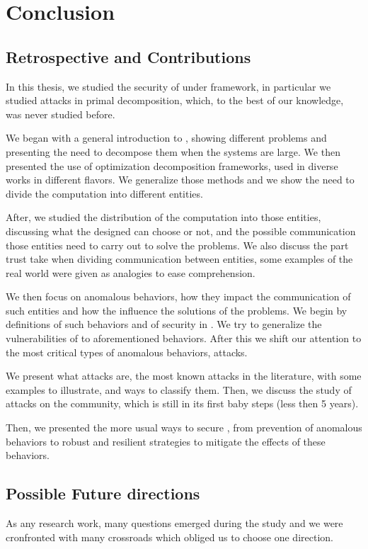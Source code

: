 \documentclass[../main.tex]{subfiles}
\begin{document}
\chapter{Conclusion}\label{sec:conclusion}

\section{Retrospective and Contributions}
\label{sec:retr-contr}
In this thesis, we studied the security of \cps{} under \dmpc{} framework, in particular we studied attacks in primal decomposition, which, to the best of our knowledge, was never studied before.

We began with a general introduction to \mpc{}, showing different \mpc{} problems and presenting the need to decompose them when the systems are large.
We then presented the use of optimization decomposition frameworks, used in diverse works in different flavors.
We generalize those methods and we show the need to divide the computation into different entities.

After, we studied the distribution of the computation into those entities, discussing what the designed can choose or not, and the possible communication those entities need to carry out to solve the problems.
We also discuss the part trust take when dividing communication between entities, some examples of the real world were given as analogies to ease comprehension.

We then focus on anomalous behaviors, how they impact the communication of such entities and how the influence the solutions of the problems.
We begin by definitions of such behaviors and of security in \cps{}.
We try to generalize the vulnerabilities of \cps{} to aforementioned behaviors.
After this we shift our attention to the most critical types of anomalous behaviors, attacks.

We present what attacks are, the most known attacks in the literature, with some examples to illustrate, and ways to classify them.
Then, we discuss the study of attacks on the \dmpc{} community, which is still
in its first baby steps (less then 5 years).

Then, we presented the more usual ways to secure \cps{}, from prevention of anomalous behaviors to robust and resilient strategies to mitigate the effects of these behaviors.

\section{Possible Future directions}
As any research work, many questions emerged during the study and we were cronfronted with many crossroads which obliged us to choose one direction.
\end{document}
